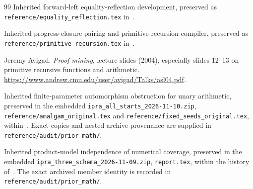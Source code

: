 \documentclass[11pt,letterpaper]{article}
\theoremstyle{definition}\newtheorem{definition}[theorem]{Definition}
\theoremstyle{remark}\newtheorem{remark}[theorem]{Remark}
\newcommand{\file}[1]{{\small\nolinkurl{#1}}}
\begin{document}
\begin{thebibliography}{99}
Inherited forward-left equality-reflection development, preserved as
\file{reference/equality_reflection.tex} in~\cite{flat}.

Inherited progress-closure pairing and primitive-recursion compiler,
preserved as \file{reference/primitive_recursion.tex} in~\cite{flat}.

Jeremy Avigad. \emph{Proof mining}, lecture slides (2004),
especially slides 12--13 on primitive recursive functions and arithmetic.
\url{https://www.andrew.cmu.edu/user/avigad/Talks/asl04.pdf}.

Inherited finite-parameter automorphism obstruction for unary arithmetic,
preserved in the embedded \file{ipra_all_starts_2026-11-10.zip},
\file{reference/amalgam_original.tex} and
\file{reference/fixed_seeds_original.tex}, within~\cite{snapshot}.
Exact copies and nested archive provenance are supplied in
\file{reference/audit/prior_math/}.

Inherited product-model independence of numerical coverage,
preserved in the embedded \file{ipra_three_schema_2026-11-09.zip},
\file{report.tex}, within the history of~\cite{snapshot}.
The exact archived member identity is recorded in
\file{reference/audit/prior_math/}.
\end{thebibliography}
\end{document}
